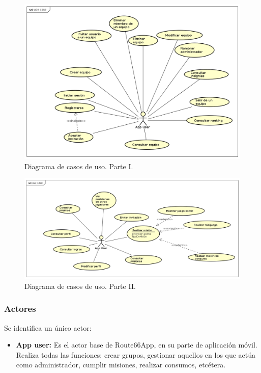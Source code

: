 \documentclass[twoside]{report}
\begin{document}
\begin{figure}[H]
\begin{center}
\includegraphics[scale=0.47]{images/usecase0.png}
\caption{Diagrama de casos de uso. Parte I.}
\end{center}
\end{figure}

\begin{figure}[H]
\begin{center}
\includegraphics[scale=0.47]{images/usecase1.png}
\caption{Diagrama de casos de uso. Parte II.}
\end{center}
\end{figure}

\subsubsection{Actores}

Se identifica un único actor:

\begin{itemize}
\item \textbf{App user:} Es el actor base de Route66App, en su parte de aplicación móvil. Realiza todas las funciones: crear grupos, gestionar aquellos en los que actúa como administrador, cumplir misiones, realizar consumos, etcétera.
\end{itemize}
\end{document}
